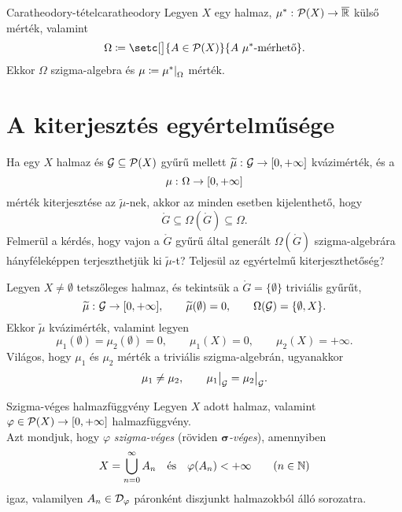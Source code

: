 \documentclass[
]{elteikthesis}[2024/04/26]
\begin{document}
	\begin{theorem}{Caratheodory-tétel}{caratheodory}
		Legyen \( X \) egy halmaz, 
		\( \mu^* \,\colon  \mathcal{P}( X )  \to  \overline{\mathbb{R}} \) külső mérték, valamint	
		\[
			\Omega \coloneq \setc[\big]{ A \in \powerset{X} }{ A \ \mu^* \text{-mérhető} }.
		\]
		Ekkor \( \Omega \) szigma-algebra és \( \mu \coloneq \restr{\mu^*}{\Omega} \) mérték.
	\end{theorem}
	
	\section{A kiterjesztés egyértelműsége}
	
	Ha egy \( X \) halmaz és \( \mathcal{G} \subseteq \mathcal{P}( X ) \) gyűrű mellett
	\( \widetilde{\mu} \,\colon \mathcal{G} \to [0, +\infty] \) kvázimérték, és a
	\[
		\mu \,\colon \Omega \to [0, +\infty]
	\]
	mérték kiterjesztése az \( \widetilde{\mu} \)-nek, akkor az minden esetben kijelenthető, hogy
	\[
		\ring{G} \subseteq \Omega( \ring{G} ) \subseteq \Omega.
	\]
	Felmerül a kérdés, hogy vajon a \( \ring{G} \) gyűrű által generált \( \Omega( \ring{G} ) \) szigma-algebrára hányféleképpen terjeszthetjük ki \( \widetilde{\mu} \)-t?
	Teljesül az egyértelmű kiterjeszthetőség?
	
	\newpage
	\begin{example}
		Legyen \( X \neq \emptyset \) tetszőleges halmaz,
		és tekintsük a \( \ring{G} = \{ \emptyset \} \) triviális gyűrűt,
		\[
			\widetilde{\mu} \,\colon \mathcal{G} \to [0, +\infty], \qquad
			\widetilde{\mu}(\emptyset) = 0, \qquad
			\Omega( \mathcal{G} ) = \{ \emptyset, X \}.
		\]
		Ekkor \( \widetilde{ \mu } \) kvázimérték, valamint legyen
		\[
			\mu_1( \emptyset ) = \mu_2( \emptyset ) = 0, \qquad
			\mu_1( X ) = 0, \qquad
			\mu_2( X ) = +\infty.
		\]
		Világos, hogy \( \mu_1 \) és \( \mu_2 \) mérték a triviális szigma-algebrán, ugyanakkor
		\[
			\mu_1 \neq \mu_2, \qquad 
			\restr{ \mu_1 }{ \ring{G} } = \restr{ \mu_2 }{ \ring{G} }.
		\]
	\end{example}
	
	\begin{definition}{Szigma-véges halmazfüggvény}{}
		Legyen \( X \) adott halmaz, 
		valamint \( \varphi \in \mathcal{P}( X ) \to [0, +\infty] \) halmazfüggvény.\\[6pt]
		Azt mondjuk, hogy \( \varphi \) \emph{szigma-véges} 
		(röviden \emph{\( \boldsymbol{\sigma} \)-véges}), amennyiben
		\[
			X = \bigcup_{n=0}^{\infty} A_n 
			\quad \text{és} \quad
			\varphi(A_n) < +\infty \qquad (n \in \mathbb{N})
		\]
		igaz, valamilyen \( A_n \in \mathcal{D}_{\varphi} \) páronként diszjunkt halmazokból álló sorozatra.
	\end{definition}
	
\end{document}
